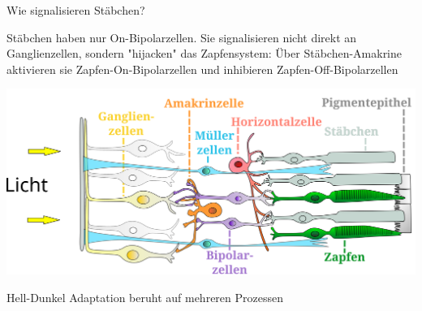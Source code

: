 \documentclass{beamer}
\begin{document}
\begin{frame}{Wie signalisieren Stäbchen?}
    
    Stäbchen haben nur On-Bipolarzellen. Sie signalisieren nicht direkt an Ganglienzellen, sondern "hijacken" das Zapfensystem: Über Stäbchen-Amakrine aktivieren sie Zapfen-On-Bipolarzellen und inhibieren Zapfen-Off-Bipolarzellen
    
    \begin{center}
        \includegraphics[width=\textwidth]{Retina_de.png}
    \end{center}
    
\end{frame}




\begin{frame}{Hell-Dunkel Adaptation beruht auf mehreren Prozessen}


    
\end{frame}


\begin{frame}{Hell-Dunkel Adaptation beruht auf mehreren Prozessen}

\begin{center}
    \includegraphics[width=\textwidth{}
    \end{center}
    
\end{frame}
\end{document}
